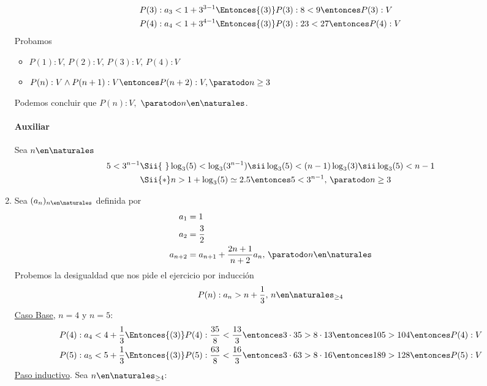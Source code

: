 \begin{enumerate}[label=\roman*)]
        \begin{align*}
           & P(3): a_3 < 1 + 3^{3-1} \Entonces{(3)} P(3): 8 < 9 \entonces P(3):V   \\
           & P(4): a_4 < 1 + 3^{4-1} \Entonces{(3)} P(3): 23 < 27 \entonces P(4):V
        \end{align*}
        Probamos
        \begin{itemize}
          \item $P(1):V,\, P(2):V,\, P(3):V,\, P(4):V$
          \item $P(n):V \land P(n+1):V \entonces P(n+2):V, \paratodo n \geq 3$
        \end{itemize}
        Podemos concluir que $P(n):V,$ $\paratodo n \en \naturales $.

        \paragraph{Auxiliar}{Sea $n \en \naturales $
          \begin{align*}
            5 < 3^{n-1} & \Sii{\ } \log_3(5) < \log_3(3^{n-1}) \sii \log_3(5) < (n-1)\log_3(3) \sii \log_3(5) < n-1 \\
                        & \Sii{*}  n > 1 + \log_3(5) \simeq 2.5 \entonces 5 < 3^{n-1},\, \paratodo n \geq 3
          \end{align*}
        }

  \item Sea $(a_n)_{n \en \naturales }$ definida por
        \setcounter{equation}{0}
        \begin{align}
          a_1     & = 1                                                           \\
          a_2     & = \frac{3}{2}                                                 \\
          a_{n+2} & = a_{n+1} + \frac{2n+1}{n+2}a_n,\, \paratodo n \en \naturales
        \end{align}
        Probemos la desigualdad que nos pide el ejercicio por inducción
        \begin{align*}
          P(n): a_n > n + \frac{1}{3}, \, n \en \naturales _{\geq 4}
        \end{align*}
        \underline{Caso Base}, $n = 4$ y $n = 5$:
        \begin{align*}
           & P(4): a_4 < 4 + \frac{1}{3} \Entonces{(3)} P(4): \frac{35}{8} < \frac{13}{3} \entonces
          3 \cdot 35 > 8 \cdot 13 \entonces 105 > 104 \entonces P(4):V                              \\
           & P(5): a_5 < 5 + \frac{1}{3} \Entonces{(3)} P(5): \frac{63}{8} < \frac{16}{3} \entonces
          3 \cdot 63 > 8 \cdot 16 \entonces 189 > 128 \entonces P(5):V
        \end{align*}
        \underline{Paso inductivo}. Sea $n \en \naturales _{\geq 4}$:


\end{enumerate}
